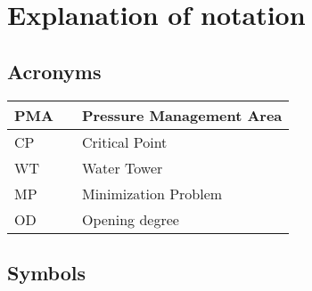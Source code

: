 \chapter{Explanation of notation}

\section*{Acronyms}
	
	\begin{tabular}{|l c l|} \hline
		PMA 		&&	Pressure Management Area		\\ \hline
		CP			&&	Critical Point					\\ \hline
		WT			&&	Water Tower						\\ \hline
		MP		  	&&	Minimization Problem			\\ \hline
		OD 			&&  Opening degree					\\ \hline
	\end{tabular}

\section*{Symbols}


